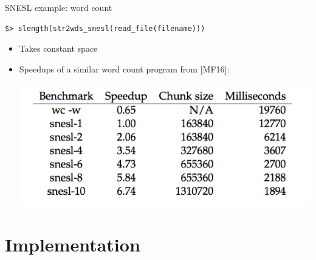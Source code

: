 \documentclass{beamer}
\begin{document}
\begin{frame}[fragile]{SNESL example: word count} \small
%
% 
 
%	
\begin{lstlisting}[style=nesl-style] 
  $> slength(str2wds_snesl(read_file(filename)))
\end{lstlisting}
\pause
\begin{itemize}
	\item Takes constant space 
	\item Speedups of a similar word count program from [MF16]:

	\centering\includegraphics[width=0.6\linewidth]{tab-workcount}
		
\end{itemize}

\end{frame}



\newcommand\tr{\triangleright}
\newcommand{\proc}{\*{Proc}}
\newcommand{\bufst}{\*{BufState}}
\newcommand{\clis}{\*{Clis}}
\newcommand{\xducer}{\*{Xducer}}
\newcommand{\filling}{\texttt{Filling} \ }
\newcommand{\draining}{\texttt{Draining} \ }
\newcommand{\pin}{ \texttt{Pin} \ }
\newcommand{\pout}{\texttt{Pout}}
\newcommand{\done}{\texttt{Done}}
\newcommand{\ftype}{\varphi}


\def\interT#1#2#3{\vdash_{#1} #2 : #3}
\def\conc#1{#1 \ {\mathbf{concrete}}}
\def\Type#1#2#3{#1 \vdash_{\Sigma} \ #2 : #3 } 
\def\Eval#1#2#3{#1 \vdash_{\Phi} #2 \Eva #3 } 
\def\Distr#1#2#3{\mathtt{distr}_{#3}(#1,#2)}
\def\Pack#1#2#3{\mathtt{pack}_{#3}(#1,#2)}

\section{Implementation}
\end{document}
